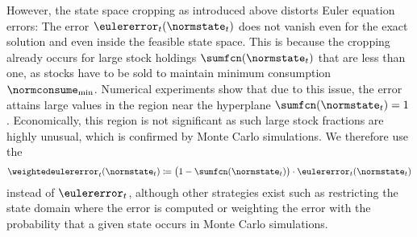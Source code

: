 However, the state space cropping as introduced above
distorts Euler equation errors:
The error $\eulererror_t(\normstate_t)$ does not vanish
even for the exact solution and even inside the feasible state space.
This is because the cropping already occurs for large stock holdings
$\sumfcn(\normstate_t)$ that are less than one,
as stocks have to be sold to maintain
minimum consumption $\normconsume_{\min}$.
Numerical experiments show that due to this issue,
the error attains large values in the region near the hyperplane
$\sumfcn(\normstate_t) = 1$.
Economically, this region is not significant
as such large stock fractions are highly unusual,
which is confirmed by Monte Carlo simulations.
We therefore use the 
\begin{equation}
  \weightedeulererror_t(\normstate_t)
  \ceq \bigl(1 - \sumfcn(\normstate_t)\bigr) \cdot
  \eulererror_t(\normstate_t)
\end{equation}
instead of $\eulererror_t$,
although other strategies exist
such as restricting the state domain where the error is computed or
weighting the error with the probability that a given state
occurs in Monte Carlo simulations.

